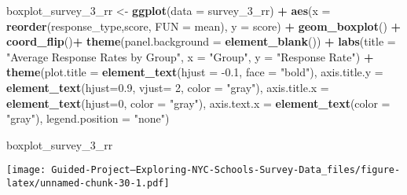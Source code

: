\documentclass[]{article}
\newenvironment{Shaded}{\begin{snugshade}}{\end{snugshade}}
\newcommand{\DataTypeTok}[1]{\textcolor[rgb]{0.13,0.29,0.53}{#1}}
\newcommand{\DecValTok}[1]{\textcolor[rgb]{0.00,0.00,0.81}{#1}}
\newcommand{\FloatTok}[1]{\textcolor[rgb]{0.00,0.00,0.81}{#1}}
\newcommand{\KeywordTok}[1]{\textcolor[rgb]{0.13,0.29,0.53}{\textbf{#1}}}
\newcommand{\NormalTok}[1]{#1}
\newcommand{\OperatorTok}[1]{\textcolor[rgb]{0.81,0.36,0.00}{\textbf{#1}}}
\newcommand{\StringTok}[1]{\textcolor[rgb]{0.31,0.60,0.02}{#1}}
\begin{document}
\begin{Shaded}
\begin{Highlighting}[]
\NormalTok{boxplot_survey_}\DecValTok{3}\NormalTok{_rr <-}\StringTok{ }\KeywordTok{ggplot}\NormalTok{(}\DataTypeTok{data =}\NormalTok{ survey_}\DecValTok{3}\NormalTok{_rr) }\OperatorTok{+}
\StringTok{  }\KeywordTok{aes}\NormalTok{(}\DataTypeTok{x =} \KeywordTok{reorder}\NormalTok{(response_type,score, }\DataTypeTok{FUN =}\NormalTok{ mean), }\DataTypeTok{y =}\NormalTok{ score) }\OperatorTok{+}
\StringTok{  }\KeywordTok{geom_boxplot}\NormalTok{() }\OperatorTok{+}
\StringTok{  }\KeywordTok{coord_flip}\NormalTok{()}\OperatorTok{+}
\StringTok{  }\KeywordTok{theme}\NormalTok{(}\DataTypeTok{panel.background =} \KeywordTok{element_blank}\NormalTok{()) }\OperatorTok{+}
\StringTok{  }\KeywordTok{labs}\NormalTok{(}\DataTypeTok{title =} \StringTok{"Average Response Rates by Group"}\NormalTok{, }\DataTypeTok{x =} \StringTok{"Group"}\NormalTok{, }\DataTypeTok{y =} \StringTok{"Response Rate"}\NormalTok{) }\OperatorTok{+}
\StringTok{  }\KeywordTok{theme}\NormalTok{(}\DataTypeTok{plot.title =} \KeywordTok{element_text}\NormalTok{(}\DataTypeTok{hjust =} \FloatTok{-0.1}\NormalTok{, }\DataTypeTok{face =} \StringTok{"bold"}\NormalTok{), }\DataTypeTok{axis.title.y =} \KeywordTok{element_text}\NormalTok{(}\DataTypeTok{hjust=}\FloatTok{0.9}\NormalTok{, }\DataTypeTok{vjust=} \DecValTok{2}\NormalTok{, }\DataTypeTok{color =} \StringTok{"gray"}\NormalTok{), }
          \DataTypeTok{axis.title.x =} \KeywordTok{element_text}\NormalTok{(}\DataTypeTok{hjust=}\DecValTok{0}\NormalTok{, }\DataTypeTok{color =} \StringTok{"gray"}\NormalTok{), }\DataTypeTok{axis.text.x =} \KeywordTok{element_text}\NormalTok{(}\DataTypeTok{color =} \StringTok{"gray"}\NormalTok{),}
          \DataTypeTok{legend.position =} \StringTok{"none"}\NormalTok{)}

\NormalTok{boxplot_survey_}\DecValTok{3}\NormalTok{_rr}
\end{Highlighting}
\end{Shaded}

\texttt{[image: Guided-Project--Exploring-NYC-Schools-Survey-Data\_files/figure-latex/unnamed-chunk-30-1.pdf]}
\end{document}
